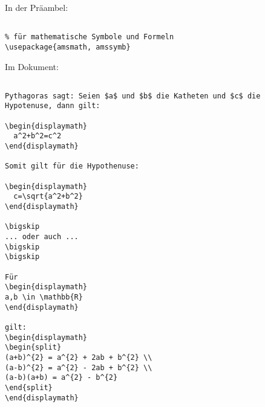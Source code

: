 
In der Präambel:

\begin{verbatim}

% für mathematische Symbole und Formeln
\usepackage{amsmath, amssymb}

\end{verbatim}

\tcblower

Im Dokument: 

\begin{verbatim}

Pythagoras sagt: Seien $a$ und $b$ die Katheten und $c$ die
Hypotenuse, dann gilt: 

\begin{displaymath}
  a^2+b^2=c^2 
\end{displaymath}
 
Somit gilt für die Hypothenuse: 

\begin{displaymath}
  c=\sqrt{a^2+b^2} 
\end{displaymath}

\bigskip 
... oder auch ...
\bigskip 
\bigskip 

Für
\begin{displaymath}
a,b \in \mathbb{R}
\end{displaymath}

gilt: 
\begin{displaymath}
\begin{split}
(a+b)^{2} = a^{2} + 2ab + b^{2} \\
(a-b)^{2} = a^{2} - 2ab + b^{2} \\
(a-b)(a+b) = a^{2} - b^{2}
\end{split}
\end{displaymath}


\end{verbatim}
